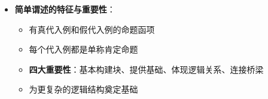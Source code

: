 \begin{center}
{{\begin{itemize}
\begin{itemize}
  \item 含有且代入常元后变成陈述的表达式
  \item \textbf{四大本质特征}：开放性、模板性、抽象性、函数性
  \item 与数学函数的深刻类比：从个体到真值的映射关系
  \item 不具有确定真值，但为生成具体命题提供结构模板
  \end{itemize}
\item \textbf{简单谓述的特征与重要性}：
  \begin{itemize}
  \item 有真代入例和假代入例的命题函项
  \item 每个代入例都是单称肯定命题
  \item \textbf{四大重要性}：基本构建块、提供基础、体现逻辑关系、连接桥梁
  \item 为更复杂的逻辑结构奠定基础
  \end{itemize}
\end{itemize}
}}
\end{center}